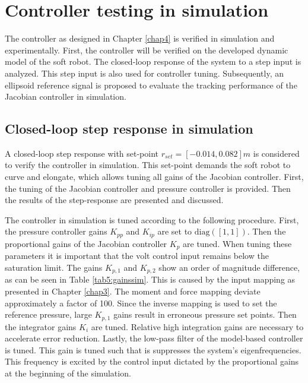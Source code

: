 \section{Controller testing in simulation}

The controller as designed in Chapter \ref{chap4} is verified in simulation and experimentally. First, the controller will be verified on the developed dynamic model of the soft robot. The closed-loop response of the system to a step input is analyzed. This step input is also used for controller tuning. Subsequently, an ellipsoid reference signal is proposed to evaluate the tracking performance of the Jacobian controller in simulation. 


\subsection*{Closed-loop step response in simulation}

A closed-loop step response with set-point $r_{set} = [-0.014,0.082]m$ is considered to verify the controller in simulation. This set-point demands the soft robot to curve and elongate, which allows tuning all gains of the Jacobian controller. First, the tuning of the Jacobian controller and pressure controller is provided. Then the results of the step-response are presented and discussed. 

The controller in simulation is tuned according to the following procedure. First, the pressure controller gains $K_{pp}$ and $K_{ip}$ are set to $\text{diag}([1,1])$. Then the proportional gains of the Jacobian controller $K_p$ are tuned. When tuning these parameters it is important that the volt control input remains below the saturation limit. The gains $K_{p,1}$ and $K_{p,2}$ show an order of magnitude difference, as can be seen in Table \ref{tab5:gainssim}. This is caused by the input mapping as presented in Chapter \ref{chap3}. The moment and force mapping deviate approximately a factor of 100. Since the inverse mapping is used to set the reference pressure, large $K_{p,1}$ gains result in erroneous pressure set points. Then the integrator gains $K_i$ are tuned. Relative high integration gains are necessary to accelerate error reduction. Lastly, the low-pass filter of the model-based controller is tuned. This gain is tuned such that is suppresses the system's eigenfrequencies. This frequency is excited by the control input dictated by the proportional gains at the beginning of the simulation. 



